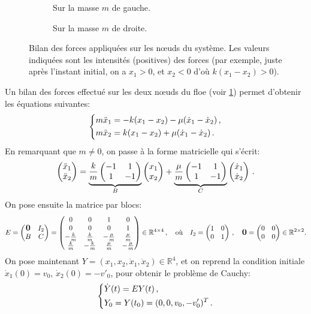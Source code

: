 \begin{figure}[!h]
    \begin{subfigure}[b]{0.33\textwidth}
        \centering
        \caption{Sur la masse $m$ de gauche.}
    \end{subfigure}
    \begin{subfigure}[b]{0.3\textwidth}
        \centering
        \caption{Sur la masse $m$ de droite.}
    \end{subfigure}
       \caption{Bilan des forces appliquées sur les n\oe{}uds du système. Les valeurs indiquées sont les intensités (positives) des forces (par exemple, juste après l'instant initial, on a $x_1 > 0$, et $x_2 < 0$ d'où $k(x_1-x_2) > 0$).}
       \label{fig:bilan0}
\end{figure}


\noindent Un bilan des forces effectué sur les deux n\oe{}uds du floe (voir \cref{fig:bilan0}) permet d'obtenir les équations suivantes:
\begin{align}
    \begin{dcases}
    m\ddot x_1 = - k(x_1 - x_2) - \mu(\dot x_1 - \dot x_2) \,,\\
        m \ddot x_2 =  k(x_1 - x_2) + \mu(\dot x_1 - \dot x_2) \,. 
    \end{dcases}
\end{align}
En remarquant que $m\neq 0$, on passe à la forme matricielle qui s'écrit:
\begin{align}
    \begin{pmatrix} \ddot{x}_1 \\ \ddot{x}_2 \end{pmatrix} = 
      \underbrace{ \frac{k}{m} \begin{pmatrix} -1 & 1 \\ 1 & -1 \end{pmatrix}}_{B} \begin{pmatrix} x_1 \\ x_2 \end{pmatrix}
    + \underbrace{\frac{\mu}{m} \begin{pmatrix} -1 & 1 \\ 1 & -1 \end{pmatrix}}_{C} \begin{pmatrix} \dot{x}_1 \\ \dot{x}_2 \end{pmatrix} \,.
\end{align}
On pose ensuite la matrice par blocs:
\[ E = \begin{pmatrix} \mbox{\normalfont\large\bfseries 0} & I_2 \\ B & C \end{pmatrix}  =  \begin{pmatrix}
    0 & 0 & 1 & 0 \\ 0 & 0& 0& 1 \\ -\frac{k}{m} & \frac{k}{m} & -\frac{\mu}{m} & \frac{\mu}{m} \\ \frac{k}{m} & -\frac{k}{m} & \frac{\mu}{m} & -\frac{\mu}{m}
\end{pmatrix}   \in \mathbb{R}^{4\times 4} \,, \quad \text{où} \quad I_2 = \begin{pmatrix} 1 & 0 \\ 0 & 1 \end{pmatrix} \,, \quad \mbox{\normalfont\large\bfseries 0} = \begin{pmatrix} 0 & 0 \\ 0 & 0 \end{pmatrix} \in \mathbb{R}^{2\times 2}. \]
On pose maintenant $Y = (x_1, x_2, \dot{x}_1, \dot{x}_2) \in \mathbb{R}^4$, et on reprend la condition initiale $\dot x_1(0) = v_0$, $\dot x_2(0) = -v'_0$, pour obtenir le problème de Cauchy:
\begin{align} \label{eq:dep1d}
    \begin{dcases}
        \dot{Y}(t)= E Y(t) \,, \\
        Y_0 = Y(t_0) = (0,0,v_0,-v'_0)^T \,.
    \end{dcases}
\end{align}

